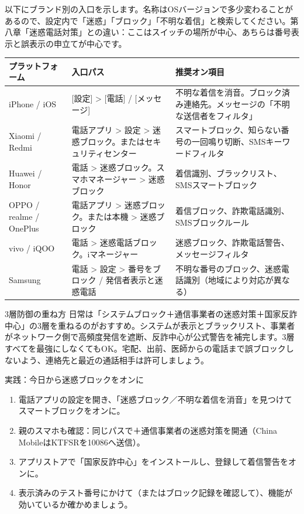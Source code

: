
以下にブランド別の入口を示します。名称はOSバージョンで多少変わることがあるので、設定内で「迷惑」「ブロック」「不明な着信」と検索してください。第八章「迷惑電話対策」との違い：ここはスイッチの場所が中心、あちらは番号表示と誤表示の申立てが中心です。

\begin{center}
\begin{tabularx}{\linewidth}{|X|X|X|}
\hline
\textbf{プラットフォーム} & \textbf{入口パス} & \textbf{推奨オン項目} \tabularnewline
\hline
iPhone / iOS & {}[設定] > [電話] / [メッセージ] & 不明な着信を消音。ブロック済み連絡先。メッセージの「不明な送信者をフィルタ」 \tabularnewline
Xiaomi / Redmi & 電話アプリ > 設定 > 迷惑ブロック。またはセキュリティセンター & スマートブロック、知らない番号の一回鳴り切断、SMSキーワードフィルタ \tabularnewline
Huawei / Honor & 電話 > 迷惑ブロック。スマホマネージャー > 迷惑ブロック & 着信識別、ブラックリスト、SMSスマートブロック \tabularnewline
OPPO / realme / OnePlus & 電話アプリ > 迷惑ブロック。または本機 > 迷惑ブロック & 着信ブロック、詐欺電話識別、SMSブロックルール \tabularnewline
vivo / iQOO & 電話 > 迷惑電話ブロック。iマネージャー & 迷惑ブロック、詐欺電話警告、メッセージフィルタ \tabularnewline
Samsung & 電話 > 設定 > 番号をブロック / 発信者表示と迷惑電話 & 不明な番号のブロック、迷惑電話識別（地域により対応が異なる） \tabularnewline
\hline
\end{tabularx}
\end{center}

\begin{tcbinfo}{3層防御の重ね方}
日常は「システムブロック＋通信事業者の迷惑対策＋国家反詐中心」の3層を重ねるのがおすすめ。システムが表示とブラックリスト、事業者がネットワーク側で高頻度発信を遮断、反詐中心が公式警告を補完します。3層すべてを最強にしなくてもOK。宅配、出前、医師からの電話まで誤ブロックしないよう、連絡先と最近の通話相手は許可しましょう。

\end{tcbinfo}

\begin{tcbpractice}{実践：今日から迷惑ブロックをオンに}
\begin{enumerate}
  \item 電話アプリの設定を開き、「迷惑ブロック／不明な着信を消音」を見つけてスマートブロックをオンに。
  \item 親のスマホも確認：同じパスで＋通信事業者の迷惑対策を開通（China MobileはKTFSRを10086へ送信）。
  \item アプリストアで「国家反詐中心」をインストールし、登録して着信警告をオンに。
  \item 表示済みのテスト番号にかけて（またはブロック記録を確認して）、機能が効いているか確かめましょう。
\end{enumerate}

\end{tcbpractice}

